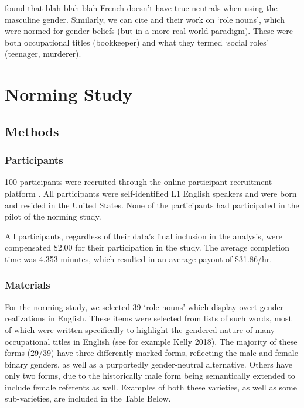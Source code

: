 \documentclass{article}
\begin{document}
	\textcite{gygax2008can} found that blah blah blah French doesn't have true neutrals when using the masculine gender. Similarly, we can cite \textcite{misersky2014norms} and their work on `role nouns', which were normed for gender beliefs (but in a more real-world paradigm). These were both occupational titles (bookkeeper) and what they termed `social roles' (teenager, murderer).

	\newpage
	\section{Norming Study}
	
	\subsection{Methods}
	
	\subsubsection{Participants}
	100 participants were recruited through the online participant recruitment platform \textcite{prolific}. All participants were self-identified L1 English speakers and were born and resided in the United States. None of the participants had participated in the pilot of the norming study. \par
	All participants, regardless of their data's final inclusion in the analysis, were compensated \$2.00 for their participation in the study. The average completion time was 4.353 minutes, which resulted in an average payout of \$31.86/hr.
		
	\subsubsection{Materials}
	For the norming study, we selected 39 `role nouns' \parencite{misersky2014norms} which display overt gender realizations in English. These items were selected from lists of such words, most of which were written specifically to highlight the gendered nature of many occupational titles in English (see for example Kelly 2018). The majority of these forms (29/39) have three differently-marked forms, reflecting the male and female binary genders, as well as a purportedly gender-neutral alternative. Others have only two forms, due to the historically male form being semantically extended to include female referents as well. Examples of both these varieties, as well as some sub-varieties, are included in the Table Below.
	
\end{document}
